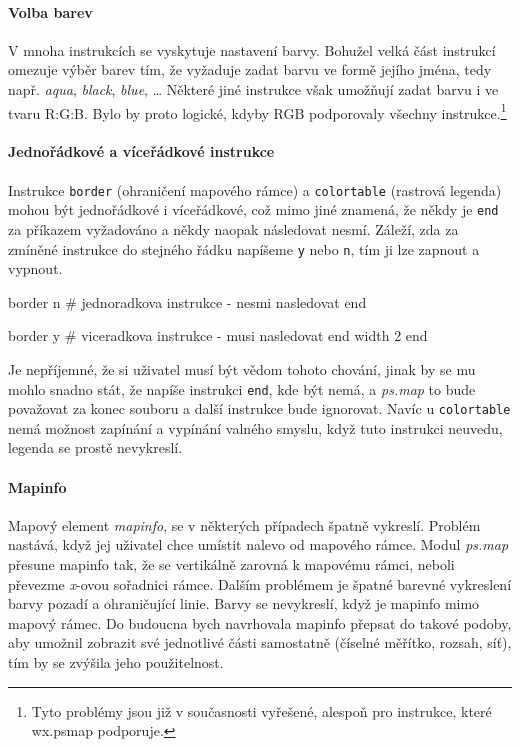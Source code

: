 \documentclass[a4paper,12pt,draft]{article}
\newcommand{\modul}[1]{\emph{#1}}
\newcommand{\instr}[1]{\lstinline[style=psmapInline]|#1|}
\begin{document}
\paragraph*{Volba barev}
\label{sec:psmap:color}
V mnoha instrukcích se vyskytuje nastavení barvy. Bohužel velká část
instrukcí omezuje výběr barev tím, že vyžaduje zadat barvu ve formě
jejího jména, tedy např. \emph{aqua}, \emph{black}, \emph{blue}, \ldots
Některé jiné instrukce však umožňují zadat barvu i ve tvaru R:G:B. Bylo
by proto logické, kdyby RGB podporovaly všechny instrukce.\footnote{Tyto
problémy jsou již v současnosti vyřešené, alespoň pro instrukce,
které wx.psmap podporuje.}

\paragraph*{Jednořádkové a víceřádkové instrukce}
\label{sec:psmap:singleline}
Instrukce \instr{border} (ohraničení mapového rámce) a \instr{colortable}
(rastrová legenda) mohou být jednořádkové i víceřádkové, což mimo
jiné znamená, že někdy je \instr{end} za příkazem vyžadováno a někdy
naopak následovat nesmí. Záleží, zda za zmíněné instrukce do stejného
řádku napíšeme \instr{y} nebo \instr{n}, tím ji lze zapnout a vypnout.
\begin{psmap}
border n    # jednoradkova instrukce - nesmi nasledovat end

border y    # viceradkova instrukce - musi nasledovat end
   width 2
end
\end{psmap}
Je nepříjemné, že si uživatel musí být vědom tohoto chování,
jinak by se mu mohlo snadno stát, že napíše instrukci \instr{end}, kde
být nemá, a \modul{ps.map} to bude považovat za konec souboru a další
instrukce bude ignorovat.
Navíc u \instr{colortable} nemá možnost zapínání a vypínání valného
smyslu, když tuto instrukci neuvedu, legenda se prostě nevykreslí.

\paragraph*{Mapinfo}
\label{sec:psmap:mapinfo}
Mapový element \emph{mapinfo}, se v některých případech špatně
vykreslí. Problém nastává, když jej uživatel chce umístit nalevo
od mapového rámce. Modul \modul{ps.map} přesune mapinfo tak, že se
vertikálně zarovná k mapovému rámci, neboli převezme \emph{x}-ovou
sořadnici rámce. Dalším problémem je špatné barevné vykreslení barvy
pozadí a ohraničující linie. Barvy se nevykreslí, když je mapinfo
mimo mapový rámec.
Do budoucna bych navrhovala mapinfo přepsat do takové podoby, aby umožnil
zobrazit své jednotlivé části samostatně (číselné měřítko, rozsah, síť), tím
by se zvýšila jeho použitelnost.
\end{document}
